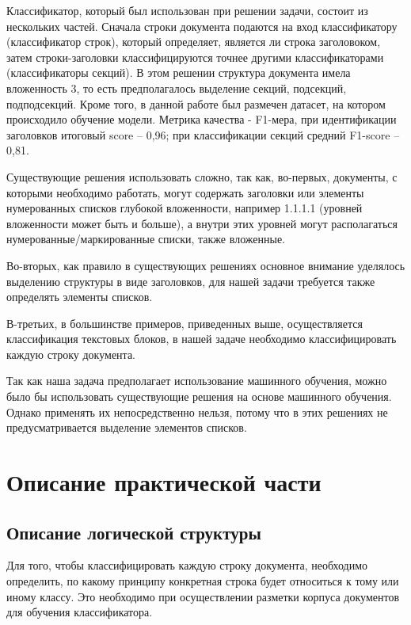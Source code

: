\documentclass[a4paper,12pt]{article}
\begin{document}
Классификатор, который был использован при решении задачи, состоит из нескольких частей. Сначала строки документа подаются на вход классификатору (классификатор строк), который определяет, является ли строка заголовоком, затем строки-заголовки классифицируются точнее другими классификаторами (классификаторы секций). В этом решении структура документа имела вложенность 3, то есть предполагалось выделение секций, подсекций, подподсекций.
Кроме того, в данной работе был размечен датасет, на котором происходило обучение модели. Метрика качества - F1-мера, при идентификации заголовков итоговый score -- 0,96; при классификации секций средний F1-score -- 0,81.

Существующие решения использовать сложно, так как, во-первых, документы, с которыми необходимо работать, могут содержать заголовки или элементы нумерованных списков глубокой вложенности, например 1.1.1.1 (уровней вложенности может быть и больше), а внутри этих уровней могут располагаться нумерованные/маркированные списки, также вложенные.

Во-вторых, как правило в существующих решениях основное внимание уделялось выделению структуры в виде заголовков, для нашей задачи требуется также определять элементы списков.

В-третьих, в большинстве примеров, приведенных выше, осуществляется классификация текстовых блоков, в нашей задаче необходимо классифицировать каждую строку документа.


Так как наша задача предполагает использование машинного обучения, можно было бы использовать существующие решения на основе машинного обучения. Однако применять их непосредственно нельзя, потому что в этих решениях не предусматривается выделение элементов списков.

\newpage
\section{Описание практической части}

\subsection{Описание логической структуры}

Для того, чтобы классифицировать каждую строку документа, необходимо определить, по какому принципу конкретная строка будет относиться к тому или иному классу. Это необходимо при осуществлении разметки корпуса документов для обучения классификатора. 
\end{document}
